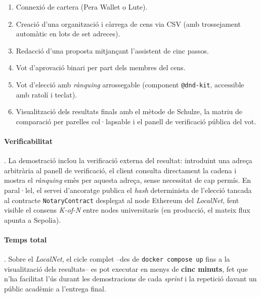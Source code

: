 \begin{enumerate}
    \item Connexió de cartera (Pera Wallet o Lute).

    \item Creació d'una organització i càrrega de cens via \ac{CSV} (amb trossejament automàtic en lots de set adreces).

    \item Redacció d'una proposta mitjançant l'assistent de cinc passos.

    \item Vot d'aprovació binari per part dels membres del cens.

    \item Vot d'elecció amb \emph{rànquing} arrossegable (component \texttt{@dnd-kit}, accessible amb ratolí i teclat).

    \item Visualització dels resultats finals amb el mètode de Schulze, la matriu de comparació per parelles
    col·lapsable i el panell de verificació pública del vot.
\end{enumerate}

\paragraph{Verificabilitat}.
La demostració inclou la verificació externa del resultat: introduint una adreça arbitrària al panell de verificació,
el client consulta directament la cadena i mostra el \emph{rànquing} emès per aquesta adreça, sense necessitat de cap
permís.
En paral·lel, el servei d'ancoratge publica el \emph{\textit{hash}} determinista de l'elecció tancada al contracte
\texttt{NotaryContract} desplegat al node Ethereum del \emph{LocalNet}, fent visible el consens \textit{K-of-N} entre
nodes universitaris (en producció, el mateix flux apunta a Sepolia).

\paragraph{Temps total}.
Sobre el \emph{LocalNet}, el cicle complet --des de \texttt{docker compose up} fins a la visualització dels resultats--
es pot executar en menys de \textbf{cinc minuts}, fet que n'ha facilitat l'ús durant les demostracions de cada
\emph{sprint} i la repetició davant un públic acadèmic a l'entrega final.
